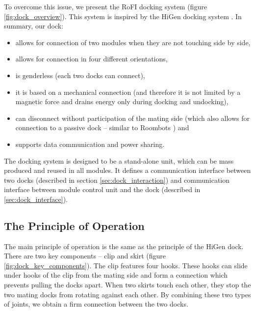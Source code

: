 To overcome this issue, we present the RoFI docking system (figure
\ref{fig:dock_overview}). This system is inspired by the HiGen docking
system \cite{parrott_higen:_2014}. In summary, our dock:
\begin{itemize}
    \item allows for connection of two modules when they are not touching side
    by side,
    \item allows for connection in four different orientations,
    \item is genderless (each two docks can connect),
    \item it is based on a mechanical connection (and therefore it is not
    limited by a magnetic force and drains energy only during docking and
    undocking),
    \item can disconnect without participation of the mating side (which also
    allows for connection to a passive dock -- similar to Roombots
    \cite{bonardi_locomotion_2012}) and
    \item supports data communication and power sharing.
\end{itemize}

The docking system is designed to be a stand-alone unit, which can be mass
produced and reused in all modules. It defines a communication interface between
two docks (described in section \ref{sec:dock_interaction}) and communication
interface between module control unit and the dock (described in
\ref{sec:dock_interface}).

\subsection{The Principle of Operation}

The main principle of operation is the same as the principle of the HiGen dock.
There are two key components -- clip and skirt (figure
\ref{fig:dock_key_components}). The clip features four hooks. These hooks can
slide under hooks of the clip from the mating side and form a connection which
prevents pulling the docks apart. When two skirts touch each other, they stop
the two mating docks from rotating against each other. By combining these two
types of joints, we obtain a firm connection between the two docks.

